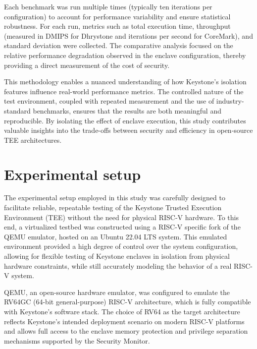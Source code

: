 Each benchmark was run multiple times (typically ten iterations per configuration) to account for performance variability and ensure statistical robustness. For each run, metrics such as total execution time, throughput (measured in DMIPS for Dhrystone and iterations per second for CoreMark), and standard deviation were collected. The comparative analysis focused on the relative performance degradation observed in the enclave configuration, thereby providing a direct measurement of the cost of security.

This methodology enables a nuanced understanding of how Keystone’s isolation features influence real-world performance metrics. The controlled nature of the test environment, coupled with repeated measurement and the use of industry-standard benchmarks, ensures that the results are both meaningful and reproducible. By isolating the effect of enclave execution, this study contributes valuable insights into the trade-offs between security and efficiency in open-source TEE architectures.

\section{Experimental setup}

The experimental setup employed in this study was carefully designed to facilitate reliable, repeatable testing of the Keystone Trusted Execution Environment (TEE) without the need for physical RISC-V hardware. To this end, a virtualized testbed was constructed using a RISC-V specific fork of the QEMU emulator, hosted on an Ubuntu 22.04 LTS system. This emulated environment provided a high degree of control over the system configuration, allowing for flexible testing of Keystone enclaves in isolation from physical hardware constraints, while still accurately modeling the behavior of a real RISC-V system.

QEMU, an open-source hardware emulator, was configured to emulate the RV64GC (64-bit general-purpose) RISC-V architecture, which is fully compatible with Keystone’s software stack. The choice of RV64 as the target architecture reflects Keystone’s intended deployment scenario on modern RISC-V platforms and allows full access to the enclave memory protection and privilege separation mechanisms supported by the Security Monitor.

